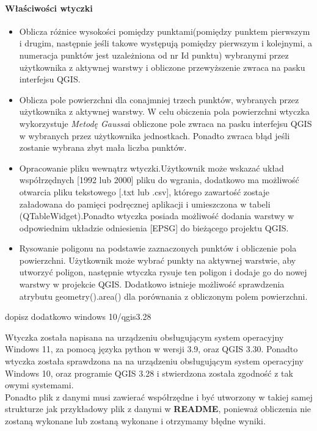 \documentclass[a4paper,titleauthor]{mwart}
\begin{document}
    \paragraph{Właściwości wtyczki}

    \begin{itemize}
     
         \item Oblicza różnice wysokości pomiędzy punktami(pomiędzy punktem pierwszym i drugim, następnie jeśli takowe występują pomiędzy pierwszym i kolejnymi, a numeracja punktów jest uzależniona od nr Id punktu) wybranymi przez użytkownika z aktywnej warstwy i obliczone przewyższenie zwraca na pasku interfejsu QGIS. 
         \item Oblicza pole powierzchni dla conajmniej trzech punktów, wybranych przez użytkownika z aktywnej warstwy. W celu obiczenia pola powierzchni wtyczka wykorzystuje \textit{Metodę Gaussa}i obliczone pole zwraca na pasku interfejsu QGIS w wybranych przez użytkownika jednostkach. Ponadto zwraca błąd jeśli zostanie wybrana zbyt mała liczba punktów.
         \item Opracowanie pliku wewnątrz wtyczki.Użytkownik może wskazać układ współrzędnych [1992 lub 2000] pliku do wgrania, dodatkowo ma możliwość otwarcia pliku tekstowego [.txt lub .csv], którego zawartość zostaje załadowana do pamięci podręcznej aplikacji i umieszczona w tabeli (QTableWidget).Ponadto wtyczka posiada możliwość dodania warstwy w odpowiednim układzie odniesienia [EPSG] do bieżącego projektu QGIS.
         \item Rysowanie poligonu na podstawie zaznaczonych punktów i obliczenie pola powierzchni. Użytkownik może wybrać punkty na aktywnej warstwie, aby utworzyć poligon, następnie wtyczka rysuje ten poligon i dodaje go do nowej warstwy w projekcie QGIS. Dodatkowo istnieje możliwość sprawdzenia atrybutu geometry().area() dla porównania z obliczonym polem powierzchni.
    
    \end{itemize}
    
    dopisz dodatkowo windows 10/qgis3.28
    
    Wtyczka została napisana na urządzeniu obsługującym system operacyjny Windows 11, za pomocą języka python w wersji 3.9, oraz QGIS 3.30. Ponadto wtyczka została sprawdzona na na urządzeniu obsługującym system operacyjny Windows 10, oraz programie QGIS 3.28 i stwierdzona została zgodność z tak owymi systemami.\\
    Ponadto plik z danymi musi zawierać współrzędne i być utworzony w takiej samej strukturze jak przykładowy plik z danymi w \textbf{README}, ponieważ obliczenia nie zostaną wykonane lub zostaną wykonane i otrzymamy błędne wyniki. 
    
\end{document}
